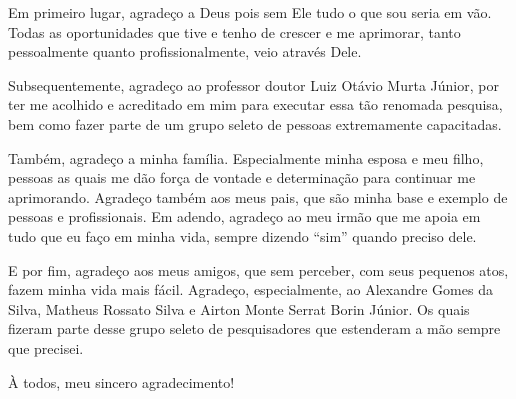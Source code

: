 \begin{agradecimentos}
Em primeiro lugar, agradeço a Deus pois sem Ele tudo o que sou seria em vão.
Todas as oportunidades que tive e tenho de crescer e me aprimorar, tanto
pessoalmente quanto profissionalmente, veio através Dele.

Subsequentemente, agradeço ao professor doutor Luiz Otávio Murta Júnior, por
ter me acolhido e acreditado em mim para executar essa tão renomada pesquisa,
bem como fazer parte de um grupo seleto de pessoas extremamente capacitadas.

Também, agradeço a minha família. Especialmente minha esposa e meu filho,
pessoas as quais me dão força de vontade e determinação para continuar me
aprimorando. Agradeço também aos meus pais, que são minha base e exemplo de
pessoas e profissionais. Em adendo, agradeço ao meu irmão que me apoia em tudo
que eu faço em minha vida, sempre dizendo ``sim'' quando preciso dele.

E por fim, agradeço aos meus amigos, que sem perceber, com seus pequenos atos,
fazem minha vida mais fácil. Agradeço, especialmente, ao Alexandre Gomes da
Silva, Matheus Rossato Silva e Airton Monte Serrat Borin Júnior. Os quais
fizeram parte desse grupo seleto de pesquisadores que estenderam a mão sempre
que precisei.

À todos, meu sincero agradecimento!
\end{agradecimentos}
